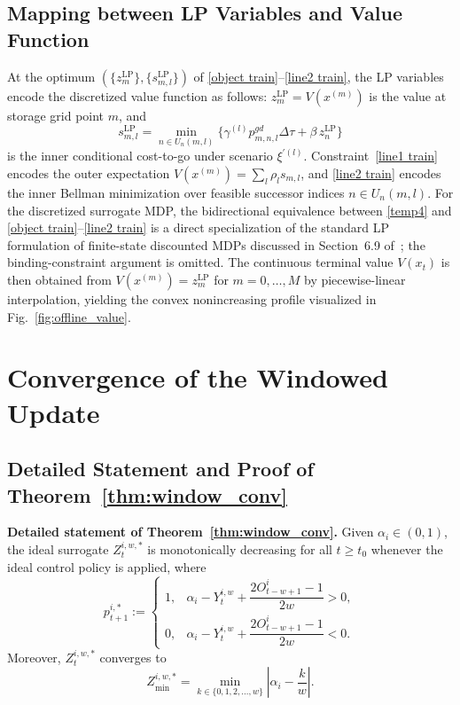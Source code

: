 \documentclass[a4paper,fleqn]{cas-dc}
\theoremstyle{plain}
\theoremstyle{remark}
\theoremstyle{plain}
\begin{document}
\subsection{Mapping between LP Variables and Value Function}
At the optimum $(\{z_m^{\mathrm{LP}}\},\{s_{m,l}^{\mathrm{LP}}\})$ of \eqref{object train}--\eqref{line2 train}, the LP variables encode the discretized value function as follows: $z_m^{\mathrm{LP}}=V(x^{(m)})$ is the value at storage grid point $m$, and
\begin{equation*}
s_{m,l}^{\mathrm{LP}}=\min_{n\in U_n(m,l)}\big\{\gamma^{(l)}p_{m,n,l}^{gd}\Delta\tau+\beta\, z_n^{\mathrm{LP}}\big\}
\end{equation*}
is the inner conditional cost-to-go under scenario $\xi^{\prime(l)}$. Constraint~\eqref{line1 train} encodes the outer expectation $V(x^{(m)})=\sum_l \rho_l s_{m,l}$, and \eqref{line2 train} encodes the inner Bellman minimization over feasible successor indices $n\in U_n(m,l)$. For the discretized surrogate MDP, the bidirectional equivalence between \eqref{temp4} and \eqref{object train}--\eqref{line2 train} is a direct specialization of the standard LP formulation of finite-state discounted MDPs discussed in Section~6.9 of~\cite{puterman1994_mdp_book}; the binding-constraint argument is omitted. The continuous terminal value $V(x_t)$ is then obtained from $V(x^{(m)})=z_m^{\mathrm{LP}}$ for $m=0,\ldots,M$ by piecewise-linear interpolation, yielding the convex nonincreasing profile visualized in Fig.~\ref{fig:offline_value}.

\section{Convergence of the Windowed Update}\label{app:adaptive_mpc_proof}

\subsection{Detailed Statement and Proof of Theorem~\ref{thm:window_conv}}\label{subsec:thm-proof}
\noindent\textbf{Detailed statement of Theorem~\ref{thm:window_conv}.}
Given $\alpha_i \in (0,1)$, the ideal surrogate $Z_t^{i,w,*}$ is monotonically decreasing for all $t \ge t_0$ whenever the ideal control policy is applied, where
\begin{equation}\label{ideal p}
p_{t+1}^{i,*} :=
\begin{cases}
1, & \alpha_i - Y_{t}^{i,w} + \dfrac{2O^{i}_{t-w+1}-1}{2w} > 0,\\[2mm]
0, & \alpha_i - Y_{t}^{i,w} + \dfrac{2O^{i}_{t-w+1}-1}{2w} < 0.
\end{cases}
\end{equation}
Moreover, $Z_t^{i,w,*}$ converges to
\begin{equation}\label{minimum Z}
    Z_{\min}^{i,w,*} = \min_{k \in \{0, 1, 2, \dots, w\}} \left| \alpha_i - \frac{k}{w} \right|.
\end{equation}
\end{document}

